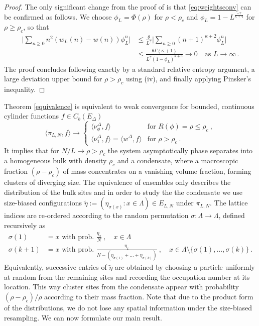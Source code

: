 \documentclass[pdflatex,sn-mathphys-num]{sn-jnl}%
\theoremstyle{thmstyleone}%
\theoremstyle{thmstyletwo}%
\theoremstyle{thmstylethree}%
\begin{document}
\begin{proof}
The only significant change from the proof of \cite[Proposition A.1]{bib_CGG22} is that \eqref{eq:weightsconv} can be confirmed as follows.
We choose $\phi_L = \Phi(\rho)$ for $\rho < \rho_c$ and $\phi_L= 1-L^{\frac{-\gamma}{\kappa + 4}}$ for $\rho \geq \rho_c$, so that
\begin{align*}
    \Big| \sum_{n\geq 0} n^2 \left( w_L (n) - w(n) \right) \phi_L^n \Big| &\leq \frac{\theta}{L^\gamma}\Big| \sum_{n\geq 0} (n+1)^{\kappa +2} \phi_L^n\Big| \\ 
    &\leq \frac{\theta\Gamma(\kappa+1)}{L^{\gamma}(1-\phi_L)^{\kappa +3}} \to 0 \quad \textrm{as } L \to \infty\,.
\end{align*}
The proof concludes following exactly  \cite{bib_CGG22} by a standard relative entropy argument, a large deviation upper bound for $\rho>\rho_c$ using (iv), and finally applying Pinsker's inequality.
\end{proof}

Theorem \ref{equivalence} is equivalent to weak convergence for bounded, continuous cylinder functions $f\in C_b (E_\Delta )$\vspace*{-5mm}
\begin{equation*}
	\langle\pi_{L,N} ,f\rangle \to
	\begin{cases}
		\langle \nu_{\phi}^\Delta ,f\rangle &\text{for } R(\phi) = \rho \leq \rho_c \ , \\
		\langle \nu_1^\Delta ,f\rangle =\langle w^\Delta ,f\rangle &\text{for } \rho > \rho_c \ .
	\end{cases}
\end{equation*}
It implies that for $N/L\to\rho >\rho_c$ the system asymptotically phase separates into a homogeneous bulk with density $\rho_c$ and a condensate, where a macroscopic fraction  $(\rho -\rho_c )$ of mass concentrates on a vanishing volume fraction, forming clusters of diverging size. The equivalence of ensembles only describes the distribution of the bulk sites and in order to study the the condensate we use size-biased configurations $\tilde\eta :=(\eta_{\sigma (x)}:x\in\Lambda)\in E_{L,N}$ under $\pi_{L,N}$. The lattice indices are re-ordered according to the random permutation $\sigma :\Lambda\to\Lambda$, defined recursively as
\begin{align}
\sigma (1)&=x\mbox{ with prob. }\frac{\eta_x}{N}\ ,\quad x\in\Lambda\nonumber\\
\sigma (k+1)&=x\mbox{ with prob. }\frac{\eta_x}{N-(\eta_{\sigma (1)}+\ldots +\eta_{\sigma (k)})}\ ,\quad x\in\Lambda\setminus\big\{\sigma (1),\ldots ,\sigma (k)\big\}\ .\label{sizebias}
\end{align}
Equivalently, successive entries of $\tilde\eta$ are obtained by choosing a particle uniformly at random from the remaining sites and recording the occupation number at its location. This way cluster sites from the condensate appear with probability $(\rho -\rho_c )/\rho$ according to their mass fraction. 
Note that due to the product form of the distributions, we do not lose any spatial information under the size-biased resampling. We can now formulate our main result.\vspace*{-3mm}
\end{document}
